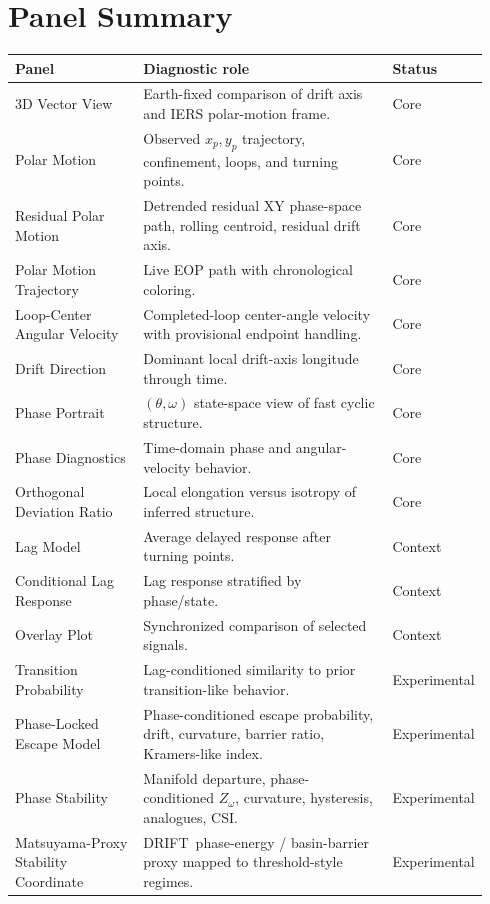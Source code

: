 \documentclass[11pt]{article}
\newcommand{\DRIFT}{\textsc{DRIFT}}
\newcommand{\Zomega}{Z_{\omega}}
\begin{document}
\section{Panel Summary}
\begin{longtable}{p{0.28\linewidth}p{0.56\linewidth}p{0.10\linewidth}}
\toprule
\textbf{Panel} & \textbf{Diagnostic role} & \textbf{Status}\\
\midrule
3D Vector View & Earth-fixed comparison of drift axis and IERS polar-motion frame. & Core\\
Polar Motion & Observed \(x_p,y_p\) trajectory, confinement, loops, and turning points. & Core\\
Residual Polar Motion & Detrended residual XY phase-space path, rolling centroid, residual drift axis. & Core\\
Polar Motion Trajectory & Live EOP path with chronological coloring. & Core\\
Loop-Center Angular Velocity & Completed-loop center-angle velocity with provisional endpoint handling. & Core\\
Drift Direction & Dominant local drift-axis longitude through time. & Core\\
Phase Portrait & \((\theta,\omega)\) state-space view of fast cyclic structure. & Core\\
Phase Diagnostics & Time-domain phase and angular-velocity behavior. & Core\\
Orthogonal Deviation Ratio & Local elongation versus isotropy of inferred structure. & Core\\
Lag Model & Average delayed response after turning points. & Context\\
Conditional Lag Response & Lag response stratified by phase/state. & Context\\
Overlay Plot & Synchronized comparison of selected signals. & Context\\
Transition Probability & Lag-conditioned similarity to prior transition-like behavior. & Experimental\\
Phase-Locked Escape Model & Phase-conditioned escape probability, drift, curvature, barrier ratio, Kramers-like index. & Experimental\\
Phase Stability & Manifold departure, phase-conditioned \(\Zomega\), curvature, hysteresis, analogues, CSI. & Experimental\\
Matsuyama-Proxy Stability Coordinate & \DRIFT\ phase-energy / basin-barrier proxy mapped to threshold-style regimes. & Experimental\\
\bottomrule
\end{longtable}
\end{document}
